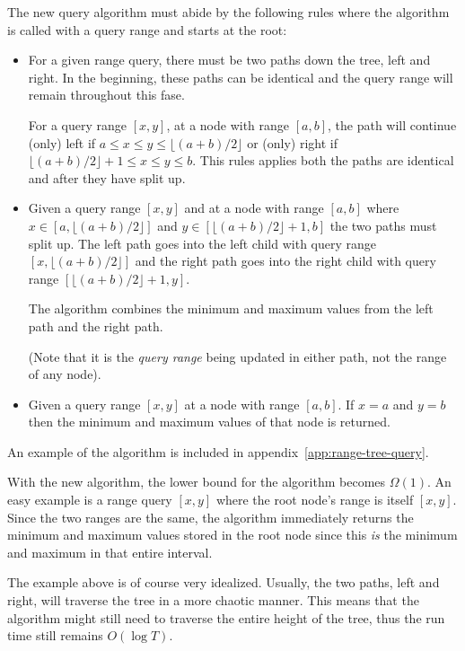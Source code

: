 The new query algorithm must abide by the following rules where the algorithm is
called with a query range and starts at the root:
\begin{itemize}
    \item For a given range query, there must be two paths down the tree, left
    and right. In the beginning, these paths can be identical and the query
    range will remain throughout this fase. 

    For a query range $[x,y]$, at a node with range $[a,b]$, the path will
    continue (only) left if $a \leq x \leq y \leq \lfloor (a+b) / 2
    \rfloor$ or (only) right if $\lfloor (a+b) / 2 \rfloor + 1 \leq x \leq y \leq
    b$. This rules applies both the paths are identical and after they have
    split up. 

    \item Given a query range $[x,y]$ and at
    a node with range $[a,b]$ where $x \in [a,\lfloor (a+b) / 2 \rfloor]$ and $y
    \in [\lfloor (a+b) / 2 \rfloor + 1,b]$ the two paths must split up. The left
    path goes into the left child with query range $[x,\lfloor (a+b) / 2
    \rfloor]$ and the right path goes into the right child with query range
    $[\lfloor (a+b) / 2 \rfloor + 1,y]$. 

    The algorithm combines the minimum and maximum values from the left path and
    the right path. 

    (Note that it is the \textit{query range} being updated in either path, not
    the range of any node). 

    \item Given a query range $[x,y]$ at a node with range $[a,b]$. If $x = a$
    and $y = b$ then the minimum and maximum values of that node is returned. 
\end{itemize}
An example of the algorithm is included in
appendix~\ref{app:range-tree-query}. 

With the new algorithm, the lower bound for the algorithm becomes $\Omega(1)$.
An easy example is a range query $[x,y]$ where the root node's range is itself
$[x,y]$. Since the two ranges are the same, the algorithm immediately returns the
minimum and maximum values stored in the root node since this \textit{is} the
minimum and maximum in that entire interval. 

The example above is of course very idealized. Usually, the two paths,
left and right, will traverse the tree in a more chaotic manner. This means that
the algorithm might still need to traverse the entire height of the tree, thus
the run time still remains $O(\log T)$. 

